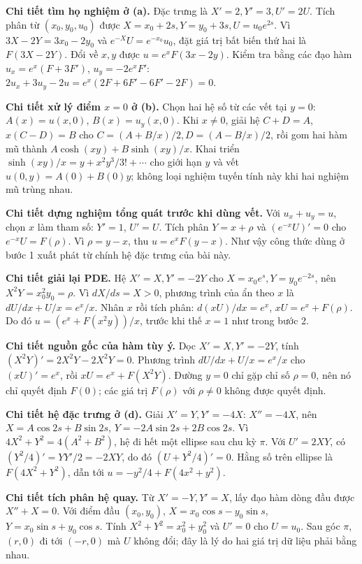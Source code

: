 \textbf{Chi tiết tìm họ nghiệm ở (a).} Đặc trưng là $X'=2,Y'=3,U'=2U$. Tích phân từ $(x_0,y_0,u_0)$ được $X=x_0+2s,Y=y_0+3s,U=u_0e^{2s}$. Vì $3X-2Y=3x_0-2y_0$ và $e^{-X}U=e^{-x_0}u_0$, đặt giá trị bất biến thứ hai là $F(3X-2Y)$. Đổi về $x,y$ được $u=e^xF(3x-2y)$. Kiểm tra bằng các đạo hàm $u_x=e^x(F+3F')$, $u_y=-2e^xF'$: $2u_x+3u_y-2u=e^x(2F+6F'-6F'-2F)=0$.

\textbf{Chi tiết xử lý điểm $x=0$ ở (b).} Chọn hai hệ số từ các vết tại $y=0$: $A(x)=u(x,0)$, $B(x)=u_y(x,0)$. Khi $x\ne0$, giải hệ $C+D=A$, $x(C-D)=B$ cho $C=(A+B/x)/2,D=(A-B/x)/2$, rồi gom hai hàm mũ thành $A\cosh(xy)+B\sinh(xy)/x$. Khai triển $\sinh(xy)/x=y+x^2y^3/3!+\cdots$ cho giới hạn $y$ và vết $u(0,y)=A(0)+B(0)y$; không loại nghiệm tuyến tính này khi hai nghiệm mũ trùng nhau.

\textbf{Chi tiết dựng nghiệm tổng quát trước khi dùng vết.} Với $u_x+u_y=u$, chọn $x$ làm tham số: $Y'=1$, $U'=U$. Tích phân $Y=x+\rho$ và $(e^{-x}U)'=0$ cho $e^{-x}U=F(\rho)$. Vì $\rho=y-x$, thu $u=e^xF(y-x)$. Như vậy công thức dùng ở bước 1 xuất phát từ chính hệ đặc trưng của bài này.

\textbf{Chi tiết giải lại PDE.} Hệ $X'=X,Y'=-2Y$ cho $X=x_0e^s,Y=y_0e^{-2s}$, nên $X^2Y=x_0^2y_0=\rho$. Vì $dX/ds=X>0$, phương trình của ẩn theo $x$ là $dU/dx+U/x=e^x/x$. Nhân $x$ rồi tích phân: $d(xU)/dx=e^x$, $xU=e^x+F(\rho)$. Do đó $u=(e^x+F(x^2y))/x$, trước khi thế $x=1$ như trong bước 2.

\textbf{Chi tiết nguồn gốc của hàm tùy ý.} Dọc $X'=X,Y'=-2Y$, tính $(X^2Y)'=2X^2Y-2X^2Y=0$. Phương trình $dU/dx+U/x=e^x/x$ cho $(xU)'=e^x$, rồi $xU=e^x+F(X^2Y)$. Đường $y=0$ chỉ gặp chỉ số $\rho=0$, nên nó chỉ quyết định $F(0)$; các giá trị $F(\rho)$ với $\rho\ne0$ không được quyết định.

\textbf{Chi tiết hệ đặc trưng ở (d).} Giải $X'=Y,Y'=-4X$: $X''=-4X$, nên $X=A\cos2s+B\sin2s$, $Y=-2A\sin2s+2B\cos2s$. Vì $4X^2+Y^2=4(A^2+B^2)$, hệ đi hết một ellipse sau chu kỳ $\pi$. Với $U'=2XY$, có $(Y^2/4)'=YY'/2=-2XY$, do đó $(U+Y^2/4)'=0$. Hằng số trên ellipse là $F(4X^2+Y^2)$, dẫn tới $u=-y^2/4+F(4x^2+y^2)$.

\textbf{Chi tiết tích phân hệ quay.} Từ $X'=-Y,Y'=X$, lấy đạo hàm dòng đầu được $X''+X=0$. Với điểm đầu $(x_0,y_0)$, $X=x_0\cos s-y_0\sin s$, $Y=x_0\sin s+y_0\cos s$. Tính $X^2+Y^2=x_0^2+y_0^2$ và $U'=0$ cho $U=u_0$. Sau góc $\pi$, $(r,0)$ đi tới $(-r,0)$ mà $U$ không đổi; đây là lý do hai giá trị dữ liệu phải bằng nhau.

